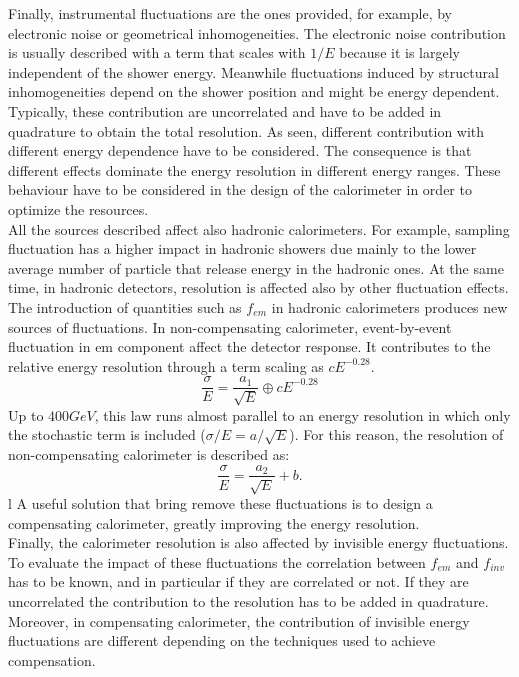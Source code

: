 Finally, instrumental fluctuations are the ones provided, for example, by electronic noise or geometrical inhomogeneities. The electronic noise contribution is usually described with a term that scales with $1/E$ because it is largely independent of the shower energy. Meanwhile fluctuations induced by structural inhomogeneities depend on the shower position and might be energy dependent.\\
Typically, these contribution are uncorrelated and have to be added in quadrature to obtain the total resolution. As seen, different contribution with different energy dependence have to be considered. The consequence is that different effects dominate the energy resolution in different energy ranges. These behaviour have to be considered in the design of the calorimeter in order to optimize the resources.\\

All the sources described affect also hadronic calorimeters. For example, sampling fluctuation has a higher impact in hadronic showers due mainly to the lower average number of particle that release energy in the hadronic ones. 
At the same time, in hadronic detectors, resolution is affected also by other fluctuation effects.\\
The introduction of quantities such as $f_{em}$ in hadronic calorimeters produces new sources of fluctuations. In non-compensating calorimeter, event-by-event fluctuation in em component affect the detector response. It contributes to the relative energy resolution through a term scaling as $c E^{-0.28}$.
\begin{equation}
    \frac{\sigma}{E} = \frac{a_1}{\sqrt{E}} \oplus c E^{-0.28}
\end{equation}
Up to $400 GeV$, this law runs almost parallel to an energy resolution in which only the stochastic term is included ($\sigma/E = a/\sqrt{E}$). For this reason, the resolution of non-compensating calorimeter is described as:
\begin{equation}
    \frac{\sigma}{E} = \frac{a_2}{\sqrt{E}} + b.
\end{equation}l
A useful solution that bring remove these fluctuations is to design a compensating calorimeter, greatly improving the energy resolution.\\
Finally, the calorimeter resolution is also affected by invisible energy fluctuations. To evaluate the impact of these fluctuations the correlation between $f_{em}$ and $f_{inv}$ has to be known, and in particular if they are correlated or not. If they are uncorrelated the contribution to the resolution has to be added in quadrature. Moreover, in compensating calorimeter, the contribution of invisible energy fluctuations are different depending on the techniques used to achieve compensation.

